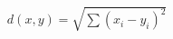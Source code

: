 \documentclass[preview]{standalone}
\begin{document}
\begin{align*}
d(x, y) = \sqrt{\sum (x_i - y_i)^2}
\end{align*}
\end{document}
